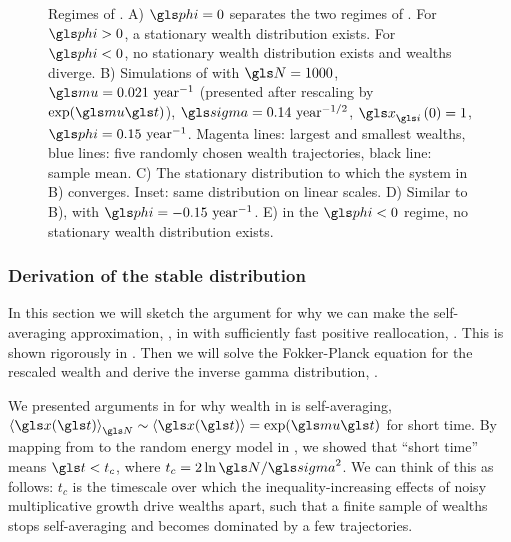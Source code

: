 \begin{figure}[!htb]
\caption{Regimes of \RGBM. A) $\gphi=0$ separates the two regimes of \RGBM. For $\gphi>0$, a stationary wealth distribution exists. For $\gphi<0$, no stationary wealth distribution exists and wealths diverge. B) Simulations of \RGBM with $\N=1000$, $\gmu=0.021 \text{ year}^{-1}$ (presented after rescaling by $\exp(\gmu \t)$), $\gsigma=0.14\text{ year}^{-1/2}$, $\x_\gi\left(0\right)=1$, $\gphi=0.15 \text{ year}^{-1}$. Magenta lines: largest and smallest wealths, blue lines: five randomly chosen wealth trajectories, black line: sample mean. C) The stationary distribution to which the system in B) converges. Inset: same distribution on linear scales. D) Similar to B), with $\gphi=-0.15 \text{ year}^{-1}$. E) in the $\gphi<0$ regime, no stationary wealth distribution exists.}
\end{figure}


\subsubsection{Derivation of the stable distribution}
In this section we will sketch the argument for why we can make the self-averaging approximation, , in \RGBM with sufficiently fast positive reallocation, . This is shown rigorously in \cite{Bouchaud2015b}. Then we will solve the Fokker-Planck equation for the rescaled wealth and derive the inverse gamma distribution, .

We presented arguments in  for why wealth in \GBM is self-averaging, $\ave{\x(\t)}_\N\sim\ave{\x(\t)}=\exp(\gmu \t)$ for short time. By mapping from \GBM to the random energy model in , we showed that ``short time'' means $\t<t_c$, where $t_c=2\ln \N/\gsigma^2$. We can think of this as follows: $t_c$ is the timescale over which the inequality-increasing effects of noisy multiplicative growth drive wealths apart, such that a finite sample of wealths stops self-averaging and becomes dominated by a few trajectories.

